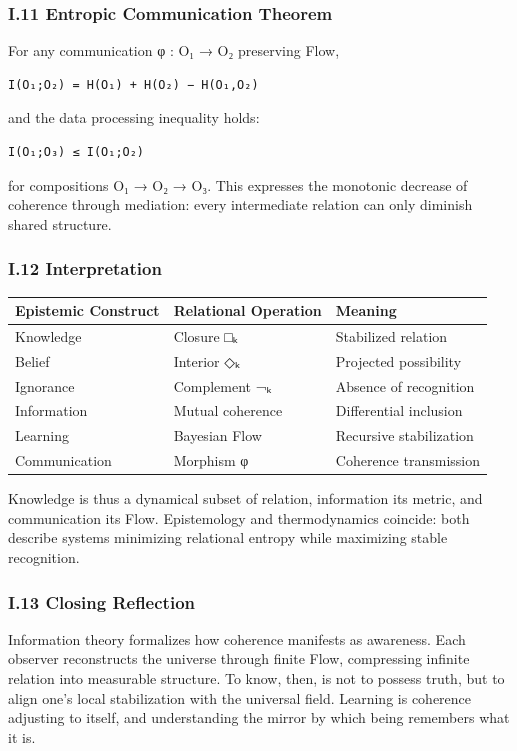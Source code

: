 \documentclass[11pt]{article}
\begin{document}
\subsubsection*{I.11 Entropic Communication Theorem}
\label{sec:orga82f6a8}
For any communication φ : O₁ → O₂ preserving Flow,

\begin{verbatim}
I(O₁;O₂) = H(O₁) + H(O₂) − H(O₁,O₂)
\end{verbatim}

and the data processing inequality holds:

\begin{verbatim}
I(O₁;O₃) ≤ I(O₁;O₂)
\end{verbatim}

for compositions O₁ → O₂ → O₃.  
This expresses the monotonic decrease of coherence through mediation:  
every intermediate relation can only diminish shared structure.
\subsubsection*{I.12 Interpretation}
\label{sec:orge0beb3b}
\begin{center}
\begin{tabular}{lll}
Epistemic Construct & Relational Operation & Meaning\\
\hline
Knowledge & Closure □ₖ & Stabilized relation\\
Belief & Interior ◇ₖ & Projected possibility\\
Ignorance & Complement ¬ₖ & Absence of recognition\\
Information & Mutual coherence & Differential inclusion\\
Learning & Bayesian Flow & Recursive stabilization\\
Communication & Morphism φ & Coherence transmission\\
\end{tabular}
\end{center}

Knowledge is thus a dynamical subset of relation,  
information its metric, and communication its Flow.  
Epistemology and thermodynamics coincide:  
both describe systems minimizing relational entropy  
while maximizing stable recognition.
\subsubsection*{I.13 Closing Reflection}
\label{sec:org8a1943f}
Information theory formalizes how coherence manifests as awareness.  
Each observer reconstructs the universe through finite Flow,  
compressing infinite relation into measurable structure.  
To know, then, is not to possess truth,  
but to align one’s local stabilization with the universal field.  
Learning is coherence adjusting to itself,  
and understanding the mirror by which being remembers what it is.
\end{document}
